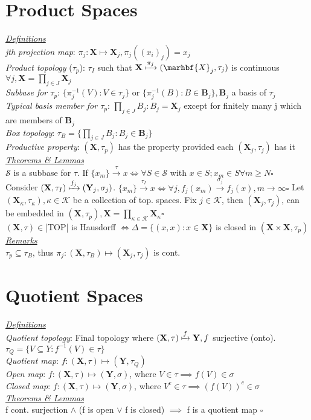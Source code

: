\section{Product Spaces}
\underline{\emph{Definitions}}\\
\emph{jth projection map}: $\pi_j:\mathbf{X}\mapsto\mathbf{X}_j,\pi_j((x_i)_j)=x_j$\\
\emph{Product topology} ($\tau_p$): $\tau_I$ such that $\mathbf{X}\xmapsto{\pi_j}(\marhbf{X}_j,\tau_j)$ is continuous $\forall j,\mathbf{X}= \prod\limits_{j\in J}\mathbf{X}_j$\\
\emph{Subbase for $\tau_p$}:
$\{\pi_j^{-1}(V):V\in\tau_j\}$ or $\{\pi_j^{-1}(B):B\in\mathbf{B}_j\},\mathbf{B}_j$ a basis of $\tau_j$\\
\emph{Typical basis member for $\tau_p$}:
$\prod\limits_{j\in J}B_j:B_j=\mathbf{X}_j$ except for finitely many j which are members of $\mathbf{B}_j$\\
\emph{Box topology}: $\tau_B=\{\prod\limits_{j\in J}B_j:B_j\in\mathbf{B}_j\}$\\
\emph{Productive property}: $(\mathbf{X},\tau_p)$ has the property provided each $(\mathbf{X}_j,\tau_j)$ has it
\\\underline{\emph{Theorems \& Lemmas}}\\
$\mathcal{S}$ is a subbase for $\tau$. If $\{x_m\}\xrightarrow{\tau}x\iff\forall S\in\mathcal{S}$ with $x\in S; x_m\in S\forall m\geq N\square$\\
Consider $(\mathbf{X},\tau_I)\xmapsto{f_j}(\mathbf{Y}_j,\sigma_j)$. $\{x_m\}\xrightarrow{\tau_I}x\iff\forall j, f_j(x_m)\xrightarrow{\sigma_j}f_j(x), m\to\infty\square$
Let $(\mathbf{X}_\kappa,\tau_\kappa), \kappa\in\mathcal{K}$ be a collection of top. spaces. Fix $j\in\mathcal{K}$, then $(\mathbf{X}_j,\tau_j)$, can be embedded in $(\mathbf{X},\tau_p),\mathbf{X}=\prod\limits_{\kappa\in\mathcal{K}}\mathbf{X}_\kappa\square$\\
$(\mathbf{X},\tau)\in$|TOP| is Hausdorff $\iff\Delta=\{(x,x):x\in\mathbf{X}\}$ is closed in $(\mathbf{X}\times\mathbf{X},\tau_p)$
\\\underline{\emph{Remarks}}\\
$\tau_p\subseteq\tau_B$, thus $\pi_j:(\mathbf{X},\tau_B)\mapsto(\mathbf{X}_j,\tau_j)$ is cont.
\section{Quotient Spaces}
\underline{\emph{Definitions}}\\
\emph{Quotient topology}: Final topology where $(\mathbf{X},\tau)\xmapsto{f}\mathbf{Y}, f$ surjective (onto). $\tau_Q=\{V\subseteq Y:f^{-1}(V)\in\tau\}$\\
\emph{Quotient map}: $f:(\mathbf{X}, \tau)\mapsto(\mathbf{Y},\tau_Q)$\\
\emph{Open map}: $f:(\mathbf{X},\tau)\mapsto(\mathbf{Y},\sigma)$, where $V\in\tau\implies f(V)\in\sigma$\\
\emph{Closed map}: $f:(\mathbf{X},\tau)\mapsto(\mathbf{Y},\sigma)$, where $V^c\in\tau\implies (f(V))^c\in\sigma$
\\\underline{\emph{Theorems \& Lemmas}}\\
f cont. surjection $\land$ (f is open $\lor$ f is closed) $\implies$ f is a quotient map $\square$
